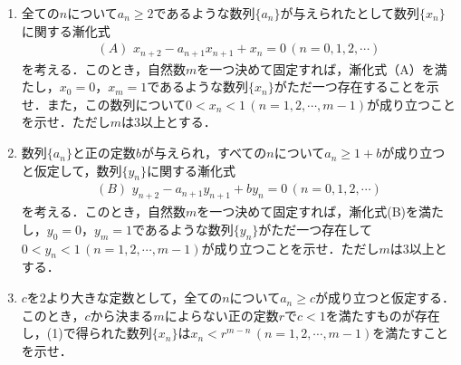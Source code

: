 \begin{enumerate}
  \item 全ての$n$について$a_n\ge 2$であるような数列$\{a_n\}$が与えられたとして数列$\{x_n\}$に関する漸化式
        \begin{align*}
          (A)\,\, x_{n+2}-a_{n+1}x_{n+1}+x_n=0 \, (n=0,1,2,\cdots)
        \end{align*}
        を考える．このとき，自然数$m$を一つ決めて固定すれば，漸化式（A）を満たし，$x_0=0$，$x_m=1$であるような数列$\{x_n\}$がただ一つ存在することを示せ．また，この数列について$0<x_n<1\, (n=1,2,\cdots,m-1)$が成り立つことを示せ．ただし$m$は$3$以上とする．
  \item 数列$\{a_n\}$と正の定数$b$が与えられ，すべての$n$について$a_n\ge 1+b$が成り立つと仮定して，数列$\{y_n\}$に関する漸化式
        \begin{align*}
          (B)\,\, y_{n+2}-a_{n+1}y_{n+1}+by_n=0 \, (n=0,1,2,\cdots)
        \end{align*}
        を考える．このとき，自然数$m$を一つ決めて固定すれば，漸化式(B)を満たし，$y_0=0$，$y_m=1$であるような数列$\{y_n\}$がただ一つ存在して$0<y_n<1\, (n=1,2,\cdots,m-1)$が成り立つことを示せ．ただし$m$は$3$以上とする．
  \item $c$を$2$より大きな定数として，全ての$n$について$a_n\ge c$が成り立つと仮定する．このとき，$c$から決まる$m$によらない正の定数$r$で$c<1$を満たすものが存在し，(1)で得られた数列$\{x_n\}$は$x_n<r^{m-n}\, (n=1,2,\cdots,m-1)$を満たすことを示せ．
\end{enumerate}